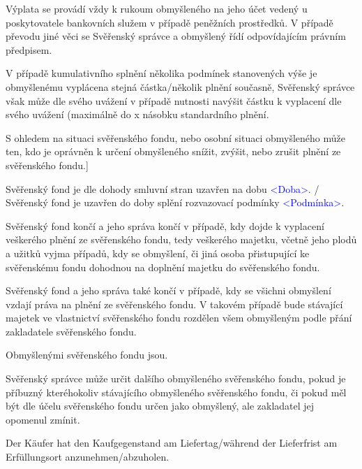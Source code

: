\documentclass[parskip=half]{scrreprt}
\begin{document}
\begin{contract}
Výplata se provádí vždy k rukoum obmyšleného na jeho účet vedený u poskytovatele bankovních služem v případě peněžních prostředků. V případě převodu jiné věci se Svěřenský správce a obmyšlený řídí odpovídajícím právním předpisem.

V případě kumulativního splnění několika podmínek stanovených výše je obmyšlenému vyplácena stejná částka/několik plnění současně, Svěřenský správce však může dle svého uvážení v případě nutnosti navýšit částku k vyplacení dle svého uvážení (maximálně do x násobku standardního plnění.

S ohledem na situaci svěřenského fondu, nebo osobní situaci obmyšleného může ten, kdo je oprávněn k určení obmyšleného snížit, zvýšit, nebo zrušit plnění ze svěřenského fondu.]
\parnumbertrue


Svěřenský fond je dle dohody smluvní stran uzavřen na dobu \textcolor{blue}{<Doba>}. / Svěřenský fond je uzavřen do doby splění rozvazovací podmínky \textcolor{blue}{<Podmínka>}.

Svěřenský fond končí a jeho správa končí v případě, kdy dojde k vyplacení veškerého plnění ze svěřenského fondu, tedy veškerého majetku, včetně jeho plodů a užitků vyjma případů, kdy se obmyšlení, či jiná osoba přistupující ke svěřenskému fondu dohodnou na doplnění majetku do svěřenského fondu.

Svěřenský fond a jeho správa také končí v případě, kdy se všichni obmyšlení vzdají práva na plnění ze svěřenského fondu. V takovém případě bude stávající majetek ve vlastnictví svěřenského fondu rozdělen všem obmyšleným podle přání zakladatele svěřenského fondu.



Obmyšlenými svěřenského fondu jsou.

Svěřenský správce může určit dalšího obmyšleného svěřenského fondu, pokud je příbuzný kteréhokoliv stávajícího obmyšleného svěřenského fondu, či pokud měl být dle účelu svěřenského fondu určen jako obmyšlený, ale zakladatel jej opomenul zmínit.


Der Käufer hat den Kaufgegenstand am Liefertag/während der Lieferfrist am Erfüllungsort anzunehmen/abzuholen.


\end{contract}
\end{document}
